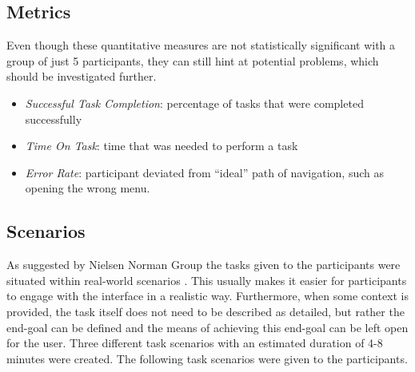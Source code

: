 


\subsection{Metrics}
Even though these quantitative measures are not statistically significant with a group of just 5 participants, they can still hint at potential problems, which should be investigated further.


\begin{itemize}
  \item \emph{Successful Task Completion}: percentage of tasks that were completed successfully
  \item \emph{Time On Task}: time that was needed to perform a task
  \item \emph{Error Rate}: participant deviated from “ideal” path of navigation, such as opening the wrong menu.
\end{itemize}


\subsection{Scenarios} \label{sec:scenario-descriptions}
As suggested by Nielsen Norman Group the tasks given to the participants were situated within real-world scenarios \cite{_task_2014}. This usually makes it easier for participants to engage with the interface in a realistic way. Furthermore, when some context is provided, the task itself does not need to be described as detailed, but rather the end-goal can be defined and the means of achieving this end-goal can be left open for the user. Three different task scenarios with an estimated duration of 4-8 minutes were created. The following task scenarios were given to the participants.

